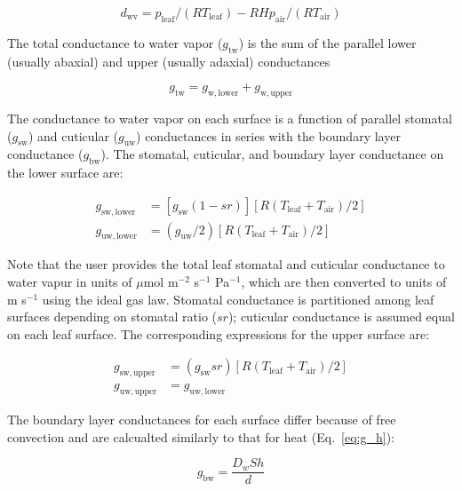 \documentclass[11pt, oneside]{article}
\begin{document}
\begin{equation}
  \label{eq:d_wv}
  d_\mathrm{wv} = p_\mathrm{leaf} / (R T_\mathrm{leaf}) - RH p_\mathrm{air} / (R T_\mathrm{air})
\end{equation}

The total conductance to water vapor ($g_\mathrm{tw}$) is the sum of the parallel lower (usually abaxial) and upper (usually adaxial) conductances

\begin{equation}
  \label{eq:g_tw}
  g_\mathrm{tw} = g_\mathrm{w,lower} + g_\mathrm{w,upper}
\end{equation} 

The conductance to water vapor on each surface is a function of parallel stomatal ($g_\mathrm{sw}$) and cuticular ($g_\mathrm{uw}$) conductances in series with the boundary layer conductance ($g_\mathrm{bw}$). The stomatal, cuticular, and boundary layer conductance on the lower surface are:

\begin{align}
  g_\mathrm{sw,lower} & = [g_\mathrm{sw} (1 - \mathit{sr})] [R (T_\mathrm{leaf} + T_\mathrm{air}) / 2] \\
  g_\mathrm{uw,lower} & = (g_\mathrm{uw} / 2) [R (T_\mathrm{leaf} + T_\mathrm{air}) / 2]
\end{align}

Note that the user provides the total leaf stomatal and cuticular conductance to water vapur in units of $\mu$mol m$^{-2}$ s$^{-1}$ Pa$^{-1}$, which are then converted to units of m s$^{-1}$ using the ideal gas law. Stomatal conductance is partitioned among leaf surfaces depending on stomatal ratio ($\mathit{sr}$); cuticular conductance is assumed equal on each leaf surface. The corresponding expressions for the upper surface are:

\begin{align}
  g_\mathrm{sw,upper} & = (g_\mathrm{sw} \mathit{sr}) [R (T_\mathrm{leaf} + T_\mathrm{air}) / 2] \\
  g_\mathrm{uw,upper} & = g_\mathrm{uw,lower}
\end{align}

The boundary layer conductances for each surface differ because of free convection \citep{Foster_Smith_1986} and are calcualted similarly to that for heat (Eq.~\ref{eq:g_h}):

\begin{equation}
  g_\mathrm{bw} = \frac{D_w \mathit{Sh}}{d}
\end{equation}
\end{document}

